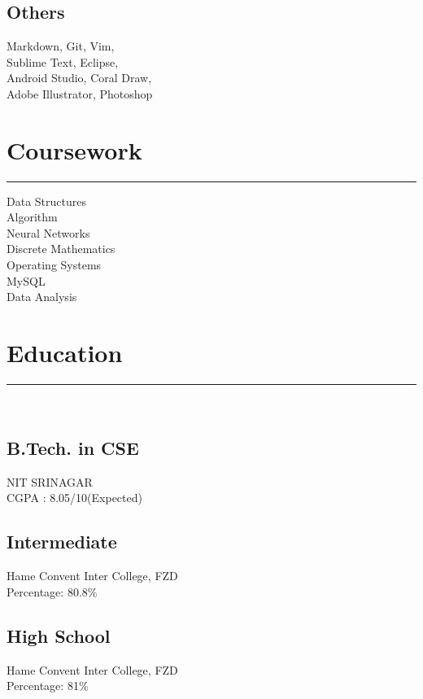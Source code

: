 \documentclass[]{rahulworld-resume}
\begin{document}
\begin{minipage}[t]{0.33\textwidth}
\subsection{Others}
Markdown, Git, Vim, \\Sublime Text, Eclipse,\\
Android Studio, Coral Draw,\\
Adobe Illustrator, Photoshop
\sectionsep
\section{Coursework}
\noindent\rule{5cm}{0.4pt}

Data Structures\\
Algorithm\\
Neural Networks\\
Discrete Mathematics\\
Operating Systems\\
MySQL\\
Data Analysis
\sectionsep
\section{Education} 
\noindent\rule{5cm}{0.4pt}\\
\subsection{B.Tech. in CSE}
NIT SRINAGAR \\
CGPA : 8.05/10(Expected)\\
\vspace{8pt}
\subsection{Intermediate}
Hame Convent Inter College, FZD\\
Percentage: 80.8\%\\
\vspace{8pt}
\subsection{High School}
Hame Convent Inter College, FZD\\
Percentage: 81\%
\sectionsep
%
%

\end{minipage} 
\end{document}
